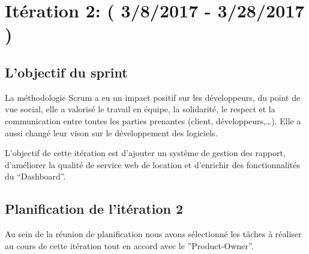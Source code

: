 \section{Itération 2: ( 3/8/2017 - 3/28/2017 )}

\subsection{L'objectif du sprint}

La méthodologie Scrum a eu un impact positif sur les développeurs, du point de vue social, elle
a valorisé le travail en équipe, la solidarité, le respect et la communication entre toutes les
parties prenantes (client, développeurs,\ldots). Elle a aussi changé leur vison sur le développement
des logiciels.

L'objectif de cette itération est d'ajouter un système de gestion des rapport, d'améliorer
la qualité de service web de location et d'enrichir des fonctionnalités du ``Dashboard''.
\subsection{Planification de l'itération 2}
  Au sein de la réunion de planification nous avons sélectionné les tâches à réaliser au
  cours de cette itération tout en accord avec le ”Product-Owner”.
